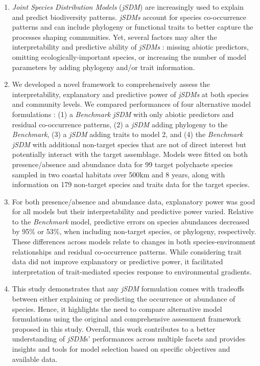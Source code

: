 \begin{enumerate}
\def\labelenumi{\arabic{enumi}.}
\item
  \emph{Joint Species Distribution Models} (\emph{jSDM}) are
  increasingly used to explain and predict biodiversity patterns.
  \emph{jSDMs} account for species co-occurrence patterns and can
  include phylogeny or functional traits to better capture the processes
  shaping communities. Yet, several factors may alter the
  interpretability and predictive ability of \emph{jSDMs} : missing
  abiotic predictors, omitting ecologically-important species, or
  increasing the number of model parameters by adding phylogeny and/or
  trait information.
\item
  We developed a novel framework to comprehensively assess the
  interpretability, explanatory and predictive power of \emph{jSDMs} at
  both species and community levels. We compared performances of four
  alternative model formulations : (1) a \emph{Benchmark} \emph{jSDM}
  with only abiotic predictors and residual co-occurrence patterns, (2)
  a \emph{jSDM} adding phylogeny to the \emph{Benchmark}, (3) a
  \emph{jSDM} adding traits to model 2, and (4) the \emph{Benchmark}
  \emph{jSDM} with additional non-target species that are not of direct
  interest but potentially interact with the target assemblage. Models
  were fitted on both presence/absence and abundance data for 99 target
  polychaete species sampled in two coastal habitats over 500km and 8
  years, along with information on 179 non-target species and traits
  data for the target species.
\item
  For both presence/absence and abundance data, explanatory power was
  good for all models but their interpretability and predictive power
  varied. Relative to the \emph{Benchmark} model, predictive errors on
  species abundances decreased by 95\% or 53\%, when including
  non-target species, or phylogeny, respectively. These differences
  across models relate to changes in both species-environment
  relationships and residual co-occurrence patterns. While considering
  trait data did not improve explanatory or predictive power, it
  facilitated interpretation of trait-mediated species response to
  environmental gradients.
\item
  This study demonstrates that any \emph{jSDM} formulation comes with
  tradeoffs between either explaining or predicting the occurrence or
  abundance of species. Hence, it highlights the need to compare
  alternative model formulations using the original and comprehensive
  assessment framework proposed in this study. Overall, this work
  contributes to a better understanding of \emph{jSDM}s' performances
  across multiple facets and provides insights and tools for model
  selection based on specific objectives and available data.
\end{enumerate}
